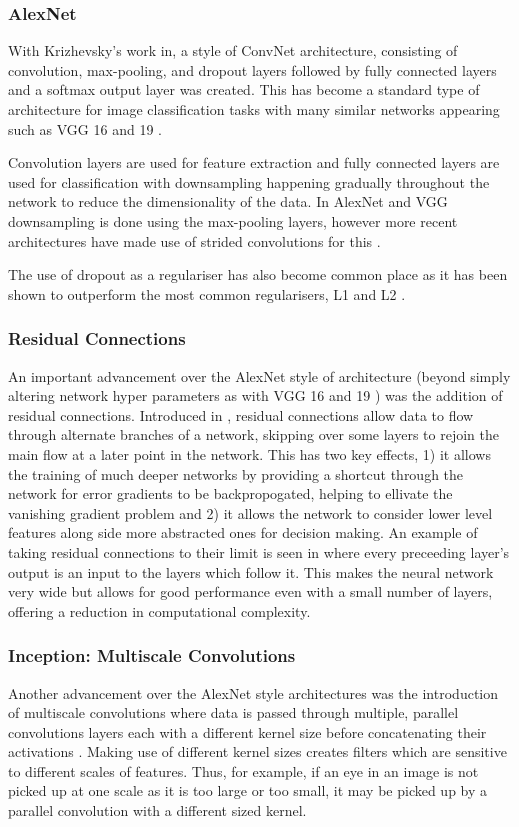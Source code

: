\subsubsection{AlexNet}
With Krizhevsky's work in\cite{krizhevsky2012imagenet}, a style of \ac{ConvNet} architecture, consisting of convolution, max-pooling, and dropout layers followed by fully connected layers and a softmax output layer was created. This has become a standard type of architecture for image classification tasks with many similar networks appearing such as VGG 16 and 19 \cite{simonyan2014very}.

Convolution layers are used for feature extraction and fully connected layers are used for classification with downsampling happening gradually throughout the network to reduce the dimensionality of the data. In AlexNet and VGG downsampling is done using the max-pooling layers, however more recent architectures have made use of strided convolutions for this \cite{springenberg2014striving}.

The use of dropout as a regulariser has also become common place as it has been shown to outperform the most common regularisers, L1 and L2 \cite{srivastava2014dropout}.

\subsubsection{Residual Connections}
An important advancement over the AlexNet style of architecture (beyond simply altering network hyper parameters as with VGG 16 and 19 \cite{simonyan2014very}) was the addition of residual connections. Introduced in \cite{he2016deep}, residual connections allow data to flow through alternate branches of a network, skipping over some layers to rejoin the main flow at a later point in the network. This has two key effects, 1) it allows the training of much deeper networks by providing a shortcut through the network for error gradients to be backpropogated, helping to ellivate the vanishing gradient problem \cite{hochreiter1998vanishing} and 2) it allows the network to consider lower level features along side more abstracted ones for decision making.
An example of taking residual connections to their limit is seen in \cite{huang2017densely} where every preceeding layer's output is an input to the layers which follow it. This makes the neural network very wide but allows for good performance even with a small number of layers, offering a reduction in computational complexity.

\subsubsection{Inception: Multiscale Convolutions}
Another advancement over the AlexNet style architectures was the introduction of multiscale convolutions where data is passed through multiple, parallel convolutions layers each with a different kernel size before concatenating their activations \cite{szegedy2015going}. Making use of different kernel sizes creates filters which are sensitive to different scales of features. Thus, for example, if an eye in an image is not picked up at one scale as it is too large or too small, it may be picked up by a parallel convolution with a different sized kernel.

